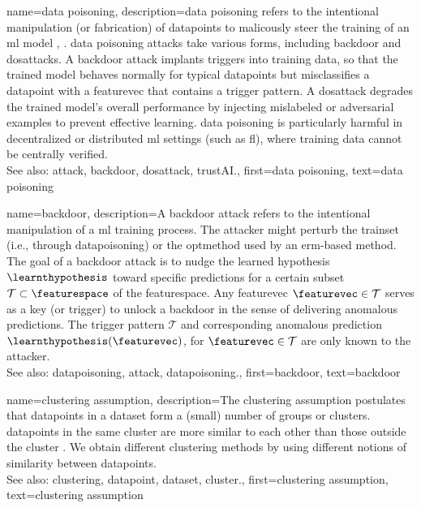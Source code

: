 {name={data poisoning}, 
	description={\Gls{data} poisoning refers to the intentional 
	             manipulation (or fabrication) of \glspl{datapoint} to malicously 
				 steer the training of an \gls{ml} \gls{model} \cite{Liu2021}, \cite{PoisonGAN}. 
  				 \Gls{data} poisoning \glspl{attack} take various forms, including 
				 \gls{backdoor} and \glspl{dosattack}. A \gls{backdoor} \gls{attack} 
				 implants triggers into training \gls{data}, so that the trained \gls{model} 
  		         behaves normally for typical \glspl{datapoint} but misclassifies a 
				 \gls{datapoint} with a \gls{featurevec} that contains a trigger pattern.
  				 A \gls{dosattack} degrades the trained \gls{model}'s overall performance 
				 by injecting mislabeled or adversarial examples to prevent effective learning.
				 \Gls{data} poisoning is particularly harmful in decentralized or 
				 distributed \gls{ml} settings (such as \gls{fl}), where training 
				 \gls{data} cannot be centrally verified.
				\\
		See also: \gls{attack}, \gls{backdoor}, \gls{dosattack}, \gls{trustAI}.},
	first={data poisoning},
	text={data poisoning} 
}
	
	
 {name={backdoor}, 
 	description={A backdoor attack refers to the intentional 
 	             manipulation of a \gls{ml} \gls{training} process. The attacker 
 				 might perturb the \gls{trainset} (i.e., through \gls{datapoisoning}) 
 				 or the \gls{optmethod} used by an \gls{erm}-based method. 
 				 The goal of a backdoor attack is to nudge the learned \gls{hypothesis} $\learnthypothesis$ 
 		         toward specific \glspl{prediction} for a certain subset $\mathcal{T} \subset \featurespace$ 
 				 of the \gls{featurespace}. Any \gls{featurevec} $\featurevec \in \mathcal{T}$ 
 				 serves as a key (or trigger) to unlock a backdoor in the sense of delivering 
 				 anomalous \glspl{prediction}. The 
 				 trigger pattern $\mathcal{T}$ and corresponding anomalous \gls{prediction} 
 				 $\learnthypothesis(\featurevec)$, for $\featurevec \in \mathcal{T}$ 
 				 are only known to the attacker.
 				\\
 		See also:  \gls{datapoisoning}, \gls{attack}, \gls{datapoisoning}.},
 	first={backdoor},
 	text={backdoor} 
 }


{name={clustering assumption}, 
	description={The 
		\gls{clustering} assumption postulates that \glspl{datapoint} in a \gls{dataset} form a (small) number of 
		groups or \glspl{cluster}. \Glspl{datapoint} in the same \gls{cluster} are more similar to each 
		other than those outside the \gls{cluster} \cite{SemiSupervisedBook}. We obtain different 
		\gls{clustering} methods by using different notions of similarity between \glspl{datapoint}.
				\\
		See also: \gls{clustering}, \gls{datapoint}, \gls{dataset}, \gls{cluster}.},
	first={clustering assumption},
	text={clustering assumption} 
}
	
